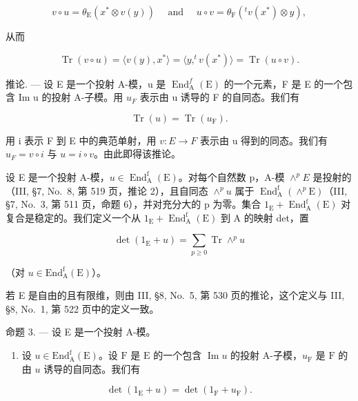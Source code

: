 \[
v \circ u = \theta_ {\mathrm{E}} (x ^ {*} \otimes v (y)) \quad \text { and } \quad u \circ v = \theta_ {\mathrm{F}} (^ {t} v (x ^ {*}) \otimes y)  ,
\]

从而

\[
\operatorname{Tr} (v \circ u) = \langle v (y), x ^ {*} \rangle = \langle y, ^ {t} v (x ^ {*}) \rangle = \operatorname{Tr} (u \circ v).
\]

推论. --- 设 E 是一个投射 A-模，u 是 \(\operatorname{End}_{\mathrm{A}}^{f}(\mathrm{E})\) 的一个元素，F 是 E 的一个包含 Im u 的投射 A-子模。用 \(u_{F}\) 表示由 u 诱导的 F 的自同态。我们有

\[
\operatorname{Tr} (u) = \operatorname{Tr} (u _ {\mathrm{F}}).\tag{4}
\]

用 i 表示 F 到 E 中的典范单射，用 \(v: E \rightarrow F\) 表示由 u 得到的同态。我们有 \(u_{F} = v \circ i\) 与 \(u = i \circ v\)。由此即得该推论。

设 E 是一个投射 A-模，\(u \in \operatorname{End}_{\mathrm{A}}^{\mathrm{f}}(\mathrm{E})\)。对每个自然数 p，A-模 \(\wedge^{p}E\) 是投射的（III, §7, No.~8, 第 519 页，推论 2），且自同态 \(\wedge^{p}u\) 属于 \(\operatorname{End}_{\mathrm{A}}^{\mathrm{f}}(\wedge^{p}\mathrm{E})\)（III, §7, No.~3, 第 511 页，命题 6），并对充分大的 p 为零。集合 \(1_{\mathrm{E}} + \operatorname{End}_{\mathrm{A}}^{\mathrm{f}}(\mathrm{E})\) 对复合是稳定的。我们定义一个从 \(1_{\mathrm{E}} + \operatorname{End}_{\mathrm{A}}^{\mathrm{f}}(\mathrm{E})\) 到 A 的映射 det，置

\[
\det (1 _ {\mathrm{E}} + u) = \sum_ {p \geqslant 0} \operatorname{Tr} \wedge^ {p} u
\]

（对 \(u\in \mathrm{End}_{\mathrm{A}}^{\mathrm{f}}(\mathrm{E})\)）。

若 E 是自由的且有限维，则由 III, §8, No.~5, 第 530 页的推论，这个定义与 III, §8, No.~1, 第 522 页中的定义一致。

命题 3. --- 设 E 是一个投射 A-模。

\begin{enumerate}
\def\labelenumi{\alph{enumi})}
\tightlist
\item
  设 \(u \in \mathrm{End}_{\mathrm{A}}^{\mathrm{f}}(\mathrm{E})\)。设 \(\mathrm{F}\) 是 \(\mathrm{E}\) 的一个包含 \(\operatorname{Im} u\) 的投射 A-子模，\(u_{\mathrm{F}}\) 是 \(\mathrm{F}\) 的由 \(u\) 诱导的自同态。我们有
\end{enumerate}

\[
\det (1 _ {\mathrm{E}} + u) = \det (1 _ {\mathrm{F}} + u _ {\mathrm{F}}).\tag{5}
\]

